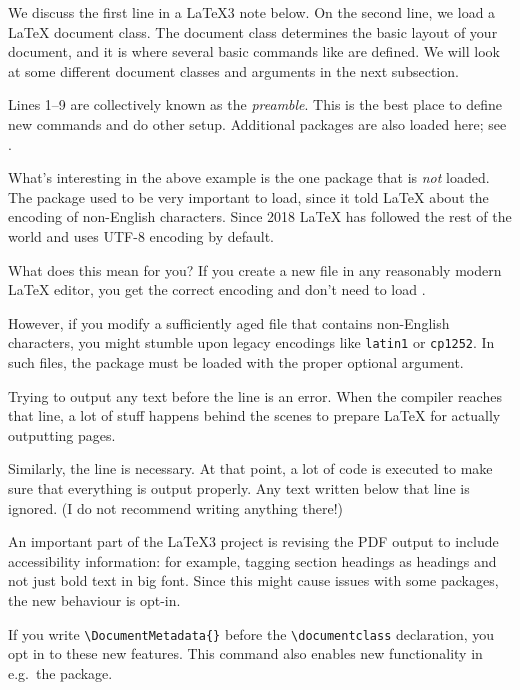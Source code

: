 We discuss the first line in a \LaTeX3 note below.
On the second line, we load a \LaTeX{} document class.
The document class determines the basic layout of your document,
and it is where several basic commands like  are defined.
We will look at some different document classes and arguments in the next subsection.

Lines 1--9 are collectively known as the \emph{preamble}.
This is the best place to define new commands and do other setup.
Additional packages are also loaded here; see .

\begin{latexthree}
What's interesting in the above example is the one package that is \emph{not} loaded.
The  package used to be very important to load,
since it told \LaTeX{} about the encoding of non-English characters.
Since 2018 \LaTeX{} has followed the rest of the world
and uses UTF-8 encoding by default.

What does this mean for you?
If you create a new file in any reasonably modern \LaTeX{} editor,
you get the correct encoding and don't need to load .

However, if you modify a sufficiently aged file that contains non-English characters,
you might stumble upon legacy encodings like \texttt{latin1} or \texttt{cp1252}.
In such files, the  package must be loaded with the proper optional argument.
\end{latexthree}



Trying to output any text before the \verb|| line is an error.
%
When the compiler reaches that line,
a lot of stuff happens behind the scenes to prepare \LaTeX{} for actually outputting pages.

Similarly, the \verb|| line is necessary.
At that point, a lot of code is executed to make sure that everything is output properly.
Any text written below that line is ignored.
(I do not recommend writing anything there!)

\begin{latexthree}
An important part of the \LaTeX3 project is revising the PDF output
to include accessibility information:
for example, tagging section headings as headings and not just bold text in big font.
Since this might cause issues with some packages, the new behaviour is opt-in.

If you write \verb|\DocumentMetadata{}|
before the \verb|\documentclass| declaration, you opt in to these new features.
This command also enables new functionality in e.g.\ the  package.
\end{latexthree}


